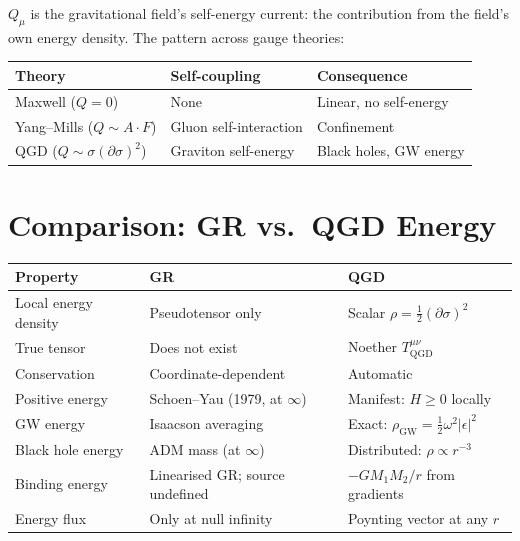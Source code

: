 \documentclass[11pt,a4paper]{article}
\theoremstyle{plain}
\theoremstyle{definition}
\theoremstyle{remark}
\begin{document}
$Q_\mu$ is the gravitational field's self-energy current: the contribution from the field's own energy density.  The pattern across gauge theories:

\begin{table}[h]
  \centering
  \begin{tabular}{@{}lll@{}}
    \toprule
    Theory & Self-coupling & Consequence \\
    \midrule
    Maxwell ($Q = 0$) & None & Linear, no self-energy \\
    Yang--Mills ($Q \sim A\cdot F$) & Gluon self-interaction & Confinement \\
    QGD ($Q \sim \sigma(\partial\sigma)^2$) & Graviton self-energy & Black holes, GW energy \\
    \bottomrule
  \end{tabular}
\end{table}

\section{Comparison: GR vs.\ QGD Energy}
\label{sec:comparison}

\begin{table}[h]
  \centering
  \renewcommand{\arraystretch}{1.3}
  \begin{tabular}{@{}p{3.8cm}p{4.8cm}p{5cm}@{}}
    \toprule
    Property & GR & QGD \\
    \midrule
    Local energy density & Pseudotensor only & Scalar $\rho = \tfrac{1}{2}(\partial\sigma)^2$ \\
    True tensor & Does not exist & Noether $T^{\mu\nu}_{\mathrm{QGD}}$ \\
    Conservation & Coordinate-dependent & Automatic \\
    Positive energy & Schoen--Yau (1979, at $\infty$) & Manifest: $H \geq 0$ locally \\
    GW energy & Isaacson averaging & Exact: $\rho_{\mathrm{GW}} = \tfrac{1}{2}\omega^2|\epsilon|^2$ \\
    Black hole energy & ADM mass (at $\infty$) & Distributed: $\rho \propto r^{-3}$ \\
    Binding energy & Linearised GR; source undefined & $-GM_1M_2/r$ from gradients \\
    Energy flux & Only at null infinity & Poynting vector at any $r$ \\
    \bottomrule
  \end{tabular}
\end{table}
\end{document}
